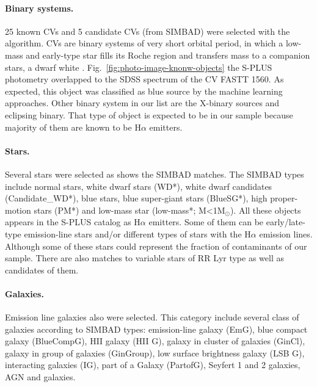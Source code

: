 \documentclass[fleqn,usenatbib]{mnras}
\begin{document}
\paragraph{Binary systems.}
25 known CVs and 5 candidate CVs (from SIMBAD) were selected with the algorithm.
CVs are binary systems of very short orbital period, in which a low-mass and
early-type star fills its Roche region and transfers mass to a companion stars,
a dwarf white \citep{Patterson:1984}. Fig.~\ref{fig:photo-image-knonw-objects} 
the S-PLUS photometry overlapped to the SDSS spectrum of the CV FASTT 1560. 
As expected, this object was classified as blue source by the machine learning approaches.
Other binary system in our list are the X-binary sources and eclipsing binary. 
That type of object is expected to be in our sample because majority of them 
are known to be H{$\alpha$} emitters.

\paragraph{Stars.}
Several stars were selected as shows the  SIMBAD matches.
The SIMBAD types include normal stars, white dwarf stars (WD*), white dwarf
candidates (Candidate\_WD*), blue stars, blue super-giant stars (BlueSG*), high
proper-motion stars (PM*) and low-mass star (low-mass*; M<1M$_\odot$). All these
objects appears in the S-PLUS catalog as H{$\alpha$} emitters. Some of them 
can be early/late-type emission-line stars and/or different types of stars with
the H{$\alpha$} emission lines. Although some of these stars could represent the 
fraction of contaminants of our sample. There are also matches to variable
stars of RR Lyr type as well as candidates of them.

\paragraph{Galaxies.}
Emission line galaxies also were selected. This category include
several class of galaxies according to SIMBAD types: emission-line galaxy (EmG),
blue compact galaxy (BlueCompG), HII galaxy (HII G), galaxy in cluster of galaxies
(GinCl), galaxy in group of galaxies (GinGroup), low surface brightness galaxy
(LSB G), interacting galaxies (IG), part of a Galaxy (PartofG), Seyfert 1 and
2 galaxies, AGN and galaxies.
\end{document}
